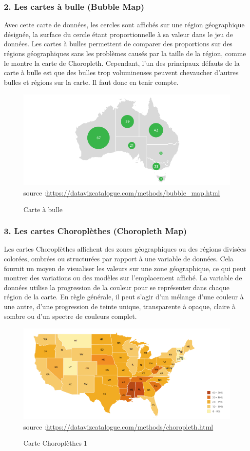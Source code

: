 \documentclass[french, a4paper, 12pt]{report}
\begin{document}
\subsubsection{2. Les cartes à bulle (Bubble Map)}
Avec cette carte de données, les cercles sont affichés sur une région géographique désignée, la surface du cercle étant proportionnelle à sa valeur dans le jeu de données. Les cartes à bulles permettent de comparer des proportions sur des régions géographiques sans les problèmes causés par la taille de la région, comme le montre la carte de Choropleth. Cependant, l'un des principaux défauts de la carte à bulle est que des bulles trop volumineuses peuvent chevaucher d'autres bulles et régions sur la carte. Il faut donc en tenir compte.
\begin{figure}[!ht]
    \centering
    \includegraphics[height=5cm]{images/bubble_map.png}
    \scriptsize{source :\url{https://datavizcatalogue.com/methods/bubble_map.html}}
    \caption{Carte à bulle}
    \label{fig:1.8}
\end{figure}
\subsubsection{3. Les cartes Choroplèthes (Choropleth Map)}
Les cartes Choroplèthes affichent des zones géographiques ou des régions divisées colorées, ombrées ou structurées par rapport à une variable de données. Cela fournit un moyen de visualiser les valeurs sur une zone géographique, ce qui peut montrer des variations ou des modèles sur l'emplacement affiché.
La variable de données utilise la progression de la couleur pour se représenter dans chaque région de la carte. En règle générale, il peut s'agir d'un mélange d'une couleur à une autre, d'une progression de teinte unique, transparente à opaque, claire à sombre ou d'un spectre de couleurs complet.
\begin{figure}[!ht]
    \centering
    \includegraphics[height=5cm]{images/choropleth.png}
    \scriptsize{source :\url{https://datavizcatalogue.com/methods/choropleth.html}}
    \caption{Carte Choroplèthes 1}
    \label{fig:1.9}
\end{figure}
\end{document}
